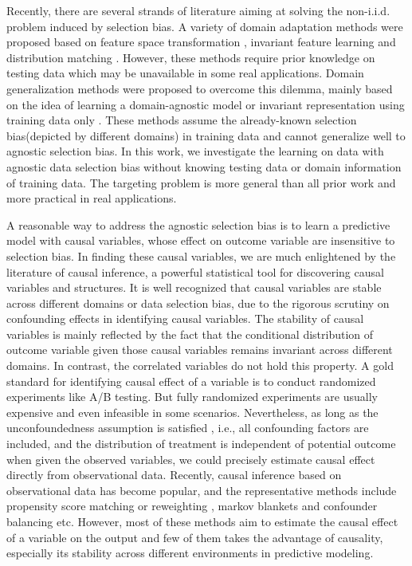 \documentclass[sigconf]{acmart}
\begin{document}
Recently, there are several strands of literature aiming at solving the non-i.i.d. problem induced by selection bias.
A variety of domain adaptation methods were proposed based on feature space transformation \cite{long2015learning,fernando2013unsupervised,DBLP:conf/mm/SanginetoZRS14,DBLP:journals/pami/MaYSH14}, invariant feature learning \cite{tzeng2015simultaneous,ganin2015unsupervised} and distribution matching \cite{zadrozny2004learning,long2016deep}.
However, these methods require prior knowledge on testing data which may be unavailable in some real applications.
Domain generalization methods were proposed to overcome this dilemma, mainly based on the idea of learning a domain-agnostic model or invariant representation using training data only \cite{Li2017Deeper,Muandet2013Domain,Ghifary2015Domain}.
These methods assume the already-known selection bias(depicted by different domains) in training data and cannot generalize well to agnostic selection bias.
In this work, we investigate the learning on data with agnostic data selection bias without knowing testing data or domain information of training data.
The targeting problem is more general than all prior work and more practical in real applications.

A reasonable way to address the agnostic selection bias is to learn a predictive model with causal variables, whose effect on outcome variable are insensitive to selection bias.
In finding these causal variables, we are much enlightened by the literature of causal inference, a powerful statistical tool for discovering causal variables and structures.
It is well recognized that causal variables are stable across different domains or data selection bias, due to the rigorous scrutiny on confounding effects \cite{rosenbaum1983central} in identifying causal variables.
The stability of causal variables is mainly reflected by the fact that the conditional distribution of outcome variable given those causal variables remains invariant across different domains.
In contrast, the correlated variables do not hold this property.
A gold standard for identifying causal effect of a variable is to conduct randomized experiments like A/B testing.
But fully randomized experiments are usually expensive and even infeasible in some scenarios.
Nevertheless, as long as the unconfoundedness assumption is satisfied \cite{rosenbaum1983central}, i.e., all confounding factors are included, and the distribution of treatment is independent of potential outcome when given the observed variables, we could precisely estimate causal effect directly from observational data.
Recently, causal inference based on observational data has become popular, and the representative methods include propensity score matching or reweighting \cite{austin2011introduction,bang2005doubly,kuang2017treatment}, markov blankets \cite{pellet2008using,koller1996toward} and confounder balancing \cite{Kuang2017Estimating,athey2016approximate,hainmueller2011entropy} etc.
However, most of these methods aim to estimate the causal effect of a variable on the output and few of them takes the advantage of causality, especially its stability across different environments in predictive modeling.
\end{document}
